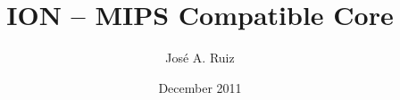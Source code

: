 \documentclass[12pt,a4paper]{memoir}
\begin{document}
\title{ION -- MIPS Compatible Core} 
\author{José A. Ruiz} 
\date{December 2011}
\maketitle
\tableofcontents
\listoffigures
\listoftables


%









 
%
 
\clearpage

 
\end{document}
